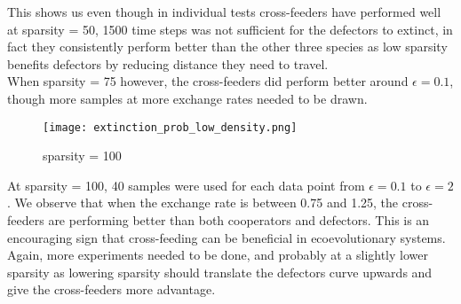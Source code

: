 \documentclass[11pt]{article}
\begin{document}
\noindent This shows us even though in individual tests cross-feeders have performed well at sparsity = 50, 1500 time steps was not sufficient for the defectors to extinct, in fact they consistently perform better than the other three species as low sparsity benefits defectors by reducing distance they need to travel.\\
When sparsity = 75 however, the cross-feeders did perform better around $\epsilon=0.1$, though more samples at more exchange rates needed to be drawn.
\begin{figure}[H]
    \centering
    \texttt{[image: extinction\_prob\_low\_density.png]}
    \caption{sparsity = 100}
\end{figure}
\noindent At sparsity = 100, 40 samples were used for each data point from $\epsilon=0.1$ to $\epsilon=2$. We observe that when the exchange rate is between 0.75 and 1.25, the cross-feeders are performing better than both cooperators and defectors. This is an encouraging sign that cross-feeding can be beneficial in ecoevolutionary systems.\\
Again, more experiments needed to be done, and probably at a slightly lower sparsity as lowering sparsity should translate the defectors curve upwards and give the cross-feeders more advantage.
\end{document}

